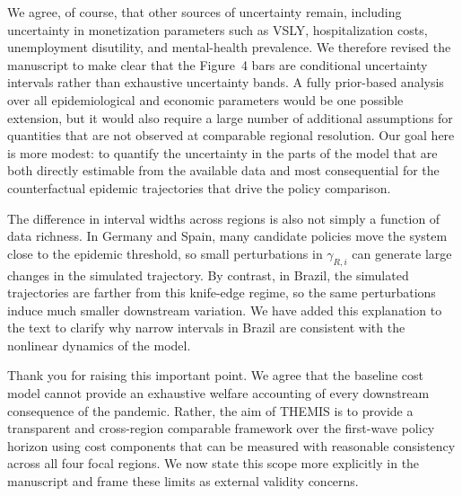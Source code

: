 \documentclass[letterpaper,twoside,11pt]{reviewresponse}
\begin{document}
We agree, of course, that other sources of uncertainty remain, including uncertainty in monetization parameters such as VSLY, hospitalization costs, unemployment disutility, and mental-health prevalence. We therefore revised the manuscript to make clear that the Figure~4 bars are conditional uncertainty intervals rather than exhaustive uncertainty bands. A fully prior-based analysis over all epidemiological and economic parameters would be one possible extension, but it would also require a large number of additional assumptions for quantities that are not observed at comparable regional resolution. Our goal here is more modest: to quantify the uncertainty in the parts of the model that are both directly estimable from the available data and most consequential for the counterfactual epidemic trajectories that drive the policy comparison.

The difference in interval widths across regions is also not simply a function of data richness. In Germany and Spain, many candidate policies move the system close to the epidemic threshold, so small perturbations in $\gamma_{R,i}$ can generate large changes in the simulated trajectory. By contrast, in Brazil, the simulated trajectories are farther from this knife-edge regime, so the same perturbations induce much smaller downstream variation. We have added this explanation to the text to clarify why narrow intervals in Brazil are consistent with the nonlinear dynamics of the model.



Thank you for raising this important point. We agree that the baseline cost model cannot provide an exhaustive welfare accounting of every downstream consequence of the pandemic. Rather, the aim of THEMIS is to provide a transparent and cross-region comparable framework over the first-wave policy horizon using cost components that can be measured with reasonable consistency across all four focal regions. We now state this scope more explicitly in the manuscript and frame these limits as external validity concerns.
\end{document}
